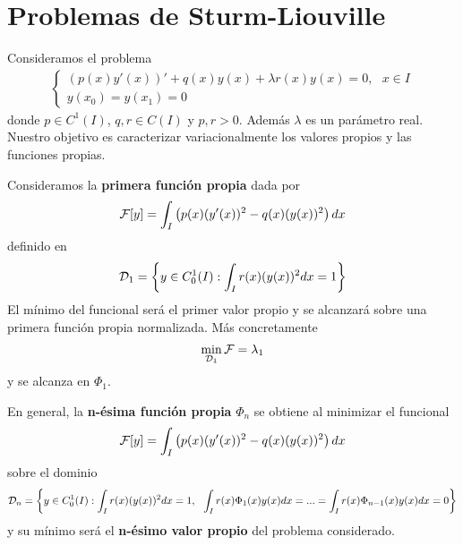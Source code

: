 \documentclass[12pt]{book}
\begin{document}
    \section{Problemas de Sturm-Liouville}
    Consideramos el problema
    \begin{gather*}
        \left\{
            \begin{array}{l}
                (p(x)y'(x))' + q(x)y(x) + \lambda r(x)y(x) = 0,\ \ \ x\in I\\
                y(x_0) = y(x_1) = 0
        \end{array}
        \right.
    \end{gather*}
    donde $p\in C^1(I)$, $q,r\in C(I)$ y $p,r>0$. Además $\lambda$ es un parámetro real.\\

    Nuestro objetivo es caracterizar variacionalmente los valores propios y las funciones propias.

    \begin{definicion}
        Consideramos la \textbf{primera función propia} dada por 
        \begin{gather*}
            \mathcal{F}[y] = \int_I \left(p(x)(y'(x))^2 - q(x)(y(x))^2\right) dx
        \end{gather*}
        definido en 
        \begin{gather*}
            \mathcal{D}_1 = \left\{ y\in C^1_0(I) : \int_I r(x)(y(x))^2dx = 1 \right\}
        \end{gather*}
        El mínimo del funcional será el primer valor propio y se alcanzará sobre una primera función propia normalizada. Más concretamente
        \begin{gather*}
            \min_{\mathcal{D}_1}\mathcal{F} = \lambda_1
        \end{gather*}
        y se alcanza en $\Phi_1$.
    \end{definicion}

    \begin{definicion}
        En general, la \textbf{n-ésima función propia} $\Phi_n$ se obtiene al minimizar el funcional 
        \begin{gather*}
            \mathcal{F}[y] = \int_I \left(p(x)(y'(x))^2 - q(x)(y(x))^2\right) dx
        \end{gather*}
        sobre el dominio
        \begin{gather*}
            \mathcal{D}_n = \left\{ y\in C^1_0(I) : \int_I r(x)(y(x))^2dx = 1,\ \ \int_I r(x)\Phi_1(x)y(x)dx = ... = \int_Ir(x)\Phi_{n-1}(x)y(x)dx = 0 \right\}
        \end{gather*}
        y su mínimo será el \textbf{n-ésimo valor propio} del problema considerado.
    \end{definicion}
\end{document}
